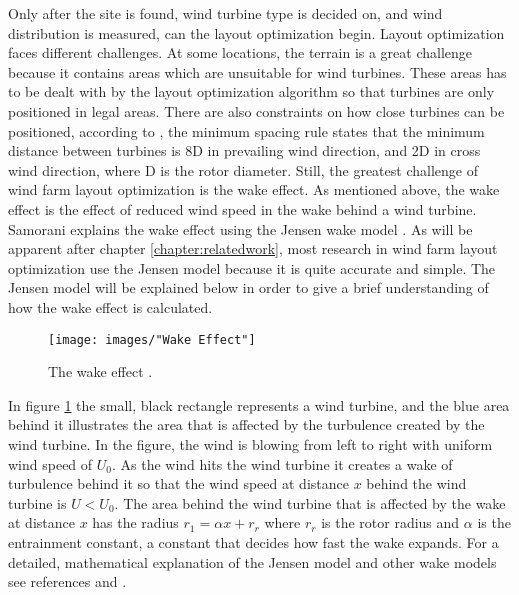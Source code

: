 \noindent Only after the site is found, wind turbine type is decided on, and wind distribution is measured, can the layout optimization begin. Layout optimization faces different challenges. At some locations, the terrain is a great challenge because it contains areas which are unsuitable for wind turbines. These areas has to be dealt with by the layout optimization algorithm so that turbines are only positioned in legal areas. There are also constraints on how close turbines can be positioned, according to \cite{Sisbot}, the minimum spacing rule states that the minimum distance between turbines is 8D in prevailing wind direction, and 2D in cross wind direction, where D is the rotor diameter. Still, the greatest challenge of wind farm layout optimization is the wake effect. As mentioned above, the wake effect is the effect of reduced wind speed in the wake behind a wind turbine. Samorani explains the wake effect using the Jensen wake model \citep{Jensen}. As will be apparent after chapter \ref{chapter:relatedwork}, most research in wind farm layout optimization use the Jensen model because it is quite accurate and simple. The Jensen model will be explained below in order to give a brief understanding of how the wake effect is calculated. \\

\begin{figure}[h!]
\begin{center}
\texttt{[image: images/"Wake Effect"]}
\caption{The wake effect \citep{Samorani}.}
\label{Wake effect}
\end{center}
\end{figure}

\noindent In figure \ref{Wake effect} the small, black rectangle represents a wind turbine, and the blue area behind it illustrates the area that is affected by the turbulence created by the wind turbine. In the figure, the wind is blowing from left to right with uniform wind speed of $U_0$. As the wind hits the wind turbine it creates a wake of turbulence behind it so that the wind speed at distance $x$ behind the wind turbine is $U < U_0$. The area behind the wind turbine that is affected by the wake at distance $x$ has the radius $r_1 = \alpha x + r_r$ where $r_r$ is the rotor radius and $\alpha$ is the entrainment constant, a constant that decides how fast the wake expands. For a detailed, mathematical explanation of the Jensen model and other wake models see references \citep{Jensen} and \citep{Liang}.\\

